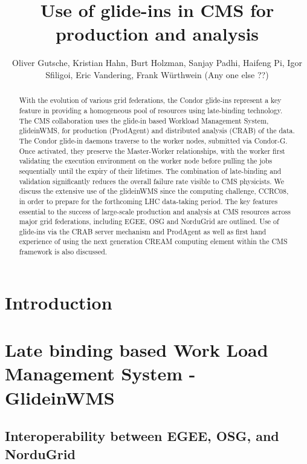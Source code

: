 \documentclass[a4paper]{jpconf}
\begin{document}
\title{Use of glide-ins in CMS for production and analysis \jpcs}

\author{Oliver Gutsche, Kristian Hahn, Burt Holzman, Sanjay Padhi, Haifeng Pi, Igor Sfiligoi, Eric Vandering, Frank W\"urthwein (Any one else ??)}

\address{FNAL, MIT, UCSD team}


\begin{abstract}
With the evolution of various grid federations, the Condor glide-ins represent a key feature in providing a homogeneous pool of resources using late-binding technology. The CMS collaboration uses the glide-in based Workload Management System, glideinWMS, for production (ProdAgent) and distributed analysis (CRAB) of the data. The Condor glide-in daemons traverse to the worker nodes, submitted via Condor-G. Once activated, they preserve the Master-Worker relationships, with the worker first validating the execution environment on the worker node before pulling the jobs sequentially until the expiry of their lifetimes. The combination of late-binding and validation significantly reduces the overall failure rate visible to CMS physicists. We discuss the extensive use of the glideinWMS since the computing challenge, CCRC08, in order to prepare for the forthcoming LHC data-taking period. The key features essential to the success of large-scale production and analysis at CMS resources across major grid federations, including EGEE, OSG and NorduGrid are outlined. Use of glide-ins via the CRAB server mechanism and ProdAgent as well as first hand experience of using the next generation CREAM computing element within the CMS framework is also discussed.
\end{abstract}

\section{Introduction}



\section{Late binding based Work Load Management System - GlideinWMS }



\subsection {Interoperability between EGEE, OSG, and NorduGrid}
\end{document}
